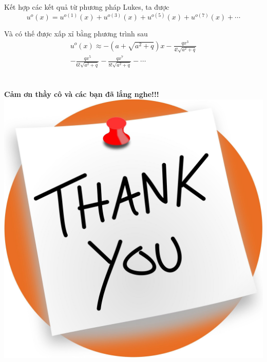 \documentclass[11pt]{beamer}
\begin{document}
\begin{frame}
Kết hợp các kết quả từ phương pháp Lukes, ta được 
\begin{equation}
	u^o(x) = u^{o(1)}(x) + u^{o(3)}(x) + u^{o(5)}(x) + u^{o(7)}(x) + \cdots 
\end{equation}

Và có thế được xấp xỉ bằng phương trình sau
\begin{equation}
\begin{split}
u^o(x) \approx -(a+\sqrt{a^2 + q})x - 
\frac{qx^3}{4!\sqrt{a^2+q}} \\- \frac{qx^5}{6!\sqrt{a^2+q}} - \frac{qx^7}{8!\sqrt{a^2+q}}-\cdots
\end{split}
\end{equation}	
\end{frame}

\section*{}

\begin{frame}
	\begin{center}
		\color{red}
		\textbf{Cảm ơn thầy cô và các bạn đã lắng nghe!!!}
		\includegraphics[scale=.1]{hinh16.jpg}
	\end{center}
\end{frame}
\end{document}

